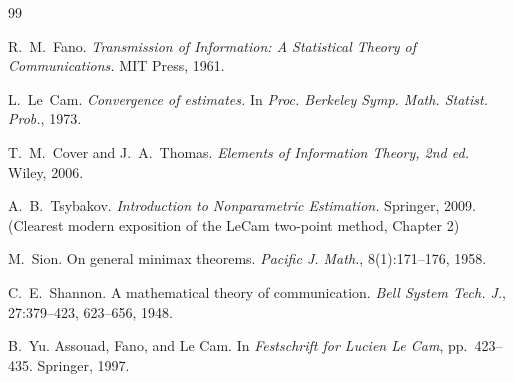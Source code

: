 \documentclass[12pt,a4paper]{article}
\theoremstyle{plain}
\theoremstyle{definition}
\begin{document}

\begin{thebibliography}{99}

R.~M.~Fano.
\textit{Transmission of Information: A Statistical Theory of Communications.}
MIT Press, 1961.

L.~Le~Cam.
\textit{Convergence of estimates.}
In \textit{Proc. Berkeley Symp. Math. Statist. Prob.}, 1973.

T.~M.~Cover and J.~A.~Thomas.
\textit{Elements of Information Theory, 2nd ed.}
Wiley, 2006.

A.~B.~Tsybakov.
\textit{Introduction to Nonparametric Estimation.}
Springer, 2009.
(Clearest modern exposition of the LeCam two-point method, Chapter 2)

M.~Sion.
On general minimax theorems.
\textit{Pacific J. Math.}, 8(1):171--176, 1958.

C.~E.~Shannon.
A mathematical theory of communication.
\textit{Bell System Tech. J.}, 27:379--423, 623--656, 1948.

B.~Yu.
Assouad, Fano, and Le Cam.
In \textit{Festschrift for Lucien Le Cam}, pp.~423--435. Springer, 1997.

\end{thebibliography}
\end{document}
